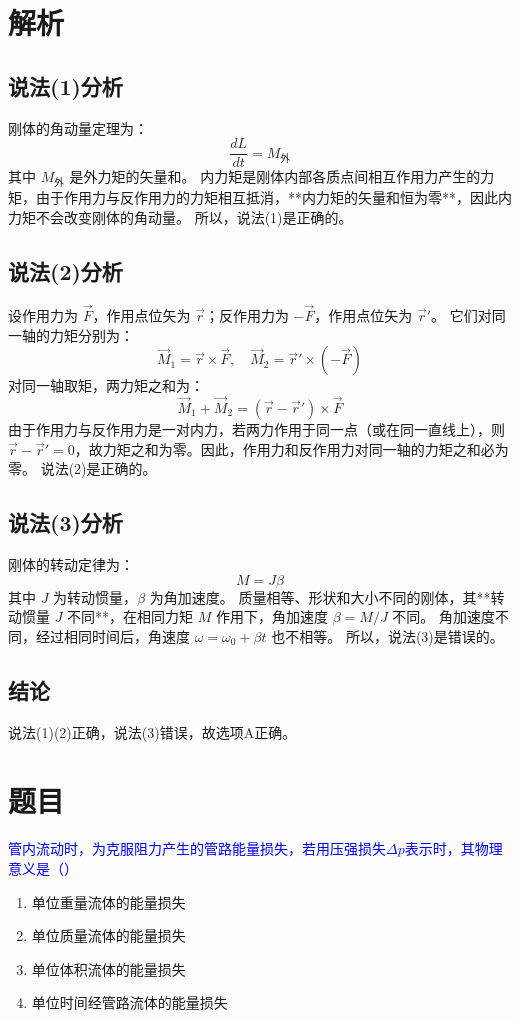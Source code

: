 \documentclass[11pt,a4paper]{article}
\begin{document}
\section*{解析}

\subsection*{说法(1)分析}
刚体的角动量定理为：
\[
\frac{dL}{dt} = M_{\text{外}}
\]
其中 \(M_{\text{外}}\) 是外力矩的矢量和。
内力矩是刚体内部各质点间相互作用力产生的力矩，由于作用力与反作用力的力矩相互抵消，**内力矩的矢量和恒为零**，因此内力矩不会改变刚体的角动量。
所以，说法(1)是正确的。

\subsection*{说法(2)分析}
设作用力为 \(\vec{F}\)，作用点位矢为 \(\vec{r}\)；反作用力为 \(-\vec{F}\)，作用点位矢为 \(\vec{r}'\)。
它们对同一轴的力矩分别为：
\[
\vec{M}_1 = \vec{r} \times \vec{F}, \quad \vec{M}_2 = \vec{r}' \times (-\vec{F})
\]
对同一轴取矩，两力矩之和为：
\[
\vec{M}_1 + \vec{M}_2 = (\vec{r} - \vec{r}') \times \vec{F}
\]
由于作用力与反作用力是一对内力，若两力作用于同一点（或在同一直线上），则 \(\vec{r} - \vec{r}' = 0\)，故力矩之和为零。因此，作用力和反作用力对同一轴的力矩之和必为零。
说法(2)是正确的。

\subsection*{说法(3)分析}
刚体的转动定律为：
\[
M = J\beta
\]
其中 \(J\) 为转动惯量，\(\beta\) 为角加速度。
质量相等、形状和大小不同的刚体，其**转动惯量 \(J\) 不同**，在相同力矩 \(M\) 作用下，角加速度 \(\beta = M/J\) 不同。
角加速度不同，经过相同时间后，角速度 \(\omega = \omega_0 + \beta t\) 也不相等。
所以，说法(3)是错误的。

\subsection*{结论}
说法(1)(2)正确，说法(3)错误，故选项A正确。


\section*{题目}
\textcolor{blue}{管内流动时，为克服阻力产生的管路能量损失，若用压强损失$\Delta p$表示时，其物理意义是（）}
\begin{enumerate}
    \item[A] 单位重量流体的能量损失
    \item[B] 单位质量流体的能量损失
    \item[C] 单位体积流体的能量损失
    \item[D] 单位时间经管路流体的能量损失
\end{enumerate}
\end{document}
